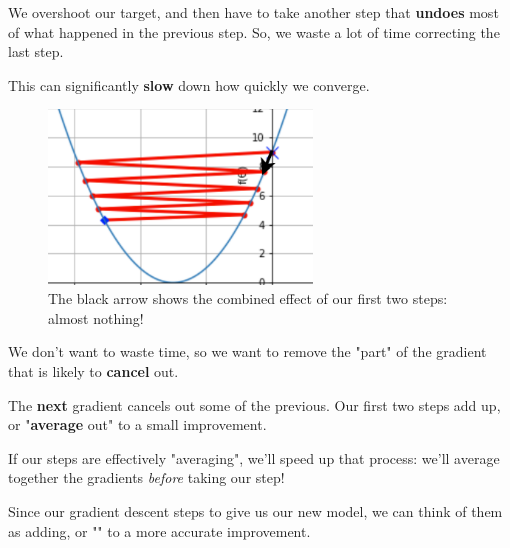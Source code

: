             We overshoot our target, and then have to take another step that \textbf{undoes} most of what happened in the previous step. So, we waste a lot of time correcting the last step.
                
            This can significantly \textbf{slow} down how quickly we converge.
                
            \begin{figure}[H]
                \centering
                    \includegraphics[width=70mm,scale=0.5]{images/nn_2_images/oscillate_zoom.png}
                
                \caption*{The black arrow shows the combined effect of our first two steps: almost nothing!}
            \end{figure}
            
            We don't want to waste time, so we want to remove the "part" of the gradient that is likely to \textbf{cancel} out. 
            
            The \textbf{next} gradient cancels out some of the previous. Our first two steps add up, or "\textbf{average} out" to a small improvement.
            
            If our steps are effectively "averaging", we'll speed up that process: we'll average together the gradients \textit{before} taking our step!
                \\
                
            \begin{concept}
                Since our gradient descent steps  to give us our new model, we can think of them as adding, or "" to a more accurate improvement.
            \end{concept}
            
            
